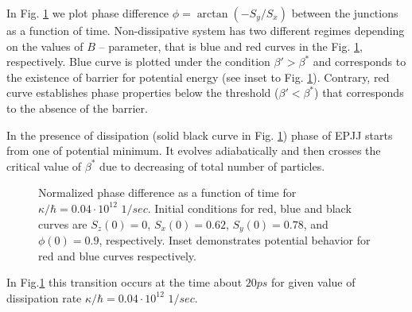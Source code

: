 \documentclass[aps, pre, preprint, groupedaddress, superscriptaddress, showkeys, showpacs] {revtex4-1}
\begin{document}
{In Fig. \ref{pic:phase} we plot phase difference $ \phi = \arctan(-S_y / S_x)$ between the junctions as a function of time.  Non-dissipative system has two different regimes depending on the values of  $B$ -- parameter, that is blue and red curves in the Fig. \ref{pic:phase}, respectively. Blue  curve is plotted under the condition $\beta' > \beta^*$ and  corresponds to the existence of barrier for potential energy (see inset to Fig. \ref{pic:phase}). Contrary,  red curve establishes phase properties below the threshold ($\beta' < \beta^*$) that corresponds to the absence of the barrier. 

In the presence of dissipation (solid black curve in Fig. \ref{pic:phase}) phase of EPJJ starts from one of potential  minimum. It evolves adiabatically and then  crosses the critical value
of $\beta^*$ due to decreasing of total number of particles. 
%
%
%
\begin{figure}[ht]
\caption{Normalized phase difference as a function of time for $\kappa / \hbar = 0.04 \cdot 10^{12}$ $1 / sec$. Initial conditions
for red, blue and black curves  are $S_z(0) = 0$, $S_x(0) = 0.62$, $S_y(0) = 0.78$, and $\phi(0) = 0.9$, respectively. Inset demonstrates potential behavior for red and blue curves respectively.
\label{pic:phase}}
\end{figure}
%
In Fig.\ref{pic:phase} this transition occurs at the time about $20ps$ for given value of dissipation rate $\kappa / \hbar = 0.04 \cdot 10^{12}$ $1 / sec$.

}
\end{document}
